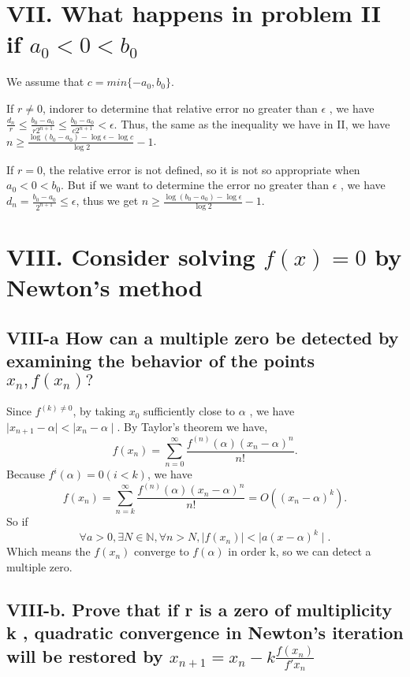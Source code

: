 \documentclass[twoside,a4paper]{article}
\begin{document}
\section*{VII. What happens in problem II if $a_0<0<b_0$}

We assume that $c=min\{-a_0, b_0\}$.

If $r\neq 0$, indorer to determine that relative error no greater than $\epsilon$
, we have $ \frac{d_{n}}{r}\le \frac{b_{0}-a_{0}}{r2^{n+1}}
\le \frac{b_0-a_0}{c2^{n+1}}<\epsilon$.
Thus, the same as the inequality we have in II, we have
$n\ge \frac{\log\left( b_0-a_0 \right)-\log\epsilon-\log c }{\log 2}-1$.

If $r=0$, the relative error is not defined, so it is not so appropriate 
when  $a_0<0<b_0$. But if we want to determine the error no greater than $\epsilon$
, we have  $d_{n}=\frac{b_0-a_0}{2^{n+1}}\le \epsilon$, thus we get 
$n\ge \frac{\log\left( b_0-a_0 \right)-\log \epsilon }{\log 2}-1$.

\section*{VIII. Consider solving $f\left( x \right)=0 $ by Newton's method}

\subsection*{VIII-a \small{How can a multiple zero be detected by examining the behavior of the points $x_{n}, f\left( x_{n} \right)?$}}

Since $f^{\left( k \right)\neq 0 }$, by taking $x_0$ sufficiently close to $\alpha$
, we have $ \mid  x_{n+1}-\alpha \mid < \mid x_{n}-\alpha \mid $.
By Taylor's theorem we have, 
\[
	f\left( x_{n}\right)=\sum_{n=0}^{\infty} 
	\frac{f^{\left( n\right) }\left(  \alpha\right)\left( x_{n}-\alpha\right)^{n}  }{n!} 
.\] 
Because $f^{i}\left( \alpha \right) =0\left(  i<k\right) $, we have
\[
	f\left( x_{n}\right)=\sum_{n=k}^{\infty} 
	\frac{f^{\left( n \right) }\left(  \alpha\right)\left( x_{n}-\alpha\right)^{n}  }{n!}
	=O\left( (x_{n}-\alpha)^{k} \right) 
.\] 
So if 
\[
	\forall a>0 , \exists N\in\mathbb{N}, \forall n>N
	, \mid f\left( x_{n} \right) \mid <  \mid a\left( x-\alpha \right)^k   \mid        
.
\]
Which means the ${f\left( x_n \right) }$ converge to  $f
\left( \alpha \right) $ in order k, so we can detect a multiple zero.

\subsection*{VIII-b. \small{Prove that if r is a zero of multiplicity k
, quadratic convergence in Newton's iteration will be restored by 
$x_{n+1}=x_{n}-k\frac{f\left( x_{n} \right) }{f'{x_{n}}}$}}
\end{document}
